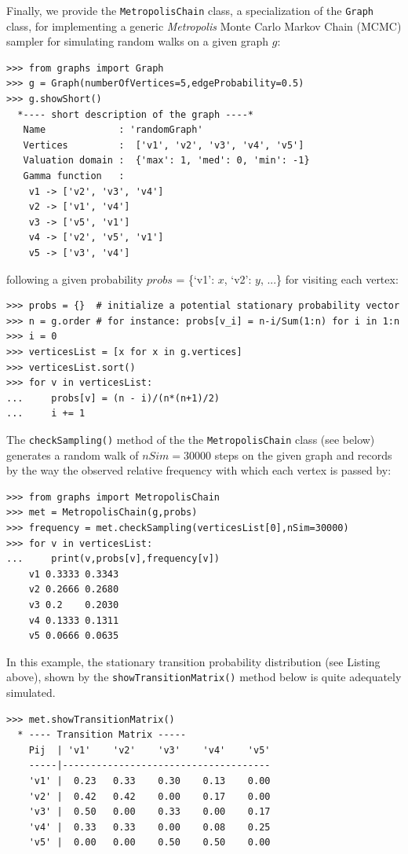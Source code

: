 Finally, we provide the \texttt{MetropolisChain} class, a specialization of the \texttt{Graph} class, for implementing a generic \emph{Metropolis} Monte Carlo Markov Chain (MCMC) sampler for simulating random walks on a given graph $g$:
\begin{lstlisting}
>>> from graphs import Graph
>>> g = Graph(numberOfVertices=5,edgeProbability=0.5)
>>> g.showShort()
  *---- short description of the graph ----*
   Name             : 'randomGraph'
   Vertices         :  ['v1', 'v2', 'v3', 'v4', 'v5']
   Valuation domain :  {'max': 1, 'med': 0, 'min': -1}
   Gamma function   :
    v1 -> ['v2', 'v3', 'v4']
    v2 -> ['v1', 'v4']
    v3 -> ['v5', 'v1']
    v4 -> ['v2', 'v5', 'v1']
    v5 -> ['v3', 'v4']
\end{lstlisting}
following a given probability $probs$ = \{‘v1’: $x$, ‘v2’: $y$, ...\} for visiting each vertex:
\begin{lstlisting}
>>> probs = {}  # initialize a potential stationary probability vector 
>>> n = g.order # for instance: probs[v_i] = n-i/Sum(1:n) for i in 1:n
>>> i = 0
>>> verticesList = [x for x in g.vertices]
>>> verticesList.sort()
>>> for v in verticesList:
...     probs[v] = (n - i)/(n*(n+1)/2)
...     i += 1
\end{lstlisting}

The \texttt{checkSampling()} method of the the \texttt{MetropolisChain} class (see below) generates a random walk of $nSim = 30000$ steps on the given graph and records by the way the observed relative frequency with which each vertex is passed by:
\begin{lstlisting}
>>> from graphs import MetropolisChain     
>>> met = MetropolisChain(g,probs)
>>> frequency = met.checkSampling(verticesList[0],nSim=30000)
>>> for v in verticesList:
...     print(v,probs[v],frequency[v])   
    v1 0.3333 0.3343
    v2 0.2666 0.2680
    v3 0.2    0.2030
    v4 0.1333 0.1311
    v5 0.0666 0.0635
\end{lstlisting}
  In this example, the stationary transition probability distribution (see Listing above), shown by the \texttt{showTransitionMatrix()} method below is quite adequately simulated.
\begin{lstlisting}
>>> met.showTransitionMatrix()
  * ---- Transition Matrix -----
    Pij  | 'v1'    'v2'    'v3'    'v4'    'v5'
    -----|-------------------------------------
    'v1' |  0.23   0.33    0.30    0.13    0.00
    'v2' |  0.42   0.42    0.00    0.17    0.00
    'v3' |  0.50   0.00    0.33    0.00    0.17
    'v4' |  0.33   0.33    0.00    0.08    0.25
    'v5' |  0.00   0.00    0.50    0.50    0.00
\end{lstlisting}

